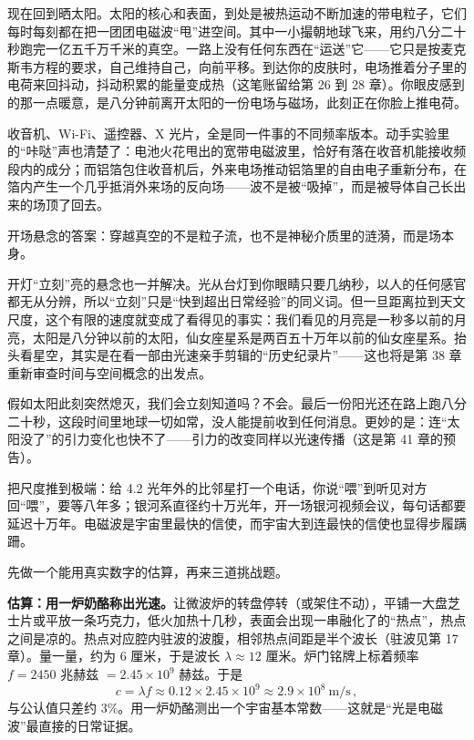 
\begin{mainline}
现在回到晒太阳。太阳的核心和表面，到处是被热运动不断加速的带电粒子，它们每时每刻都在把一团团电磁波“甩”进空间。其中一小撮朝地球飞来，用约八分二十秒跑完一亿五千万千米的真空。一路上没有任何东西在“运送”它——它只是按麦克斯韦方程的要求，自己维持自己，向前平移。到达你的皮肤时，电场推着分子里的电荷来回抖动，抖动积累的能量变成热（这笔账留给第 26 到 28 章）。你眼皮感到的那一点暖意，是八分钟前离开太阳的一份电场与磁场，此刻正在你脸上推电荷。

收音机、Wi-Fi、遥控器、X 光片，全是同一件事的不同频率版本。动手实验里的“咔哒”声也清楚了：电池火花甩出的宽带电磁波里，恰好有落在收音机能接收频段内的成分；而铝箔包住收音机后，外来电场推动铝箔里的自由电子重新分布，在箔内产生一个几乎抵消外来场的反向场——波不是被“吸掉”，而是被导体自己长出来的场顶了回去。

开场悬念的答案：穿越真空的不是粒子流，也不是神秘介质里的涟漪，而是场本身。

开灯“立刻”亮的悬念也一并解决。光从台灯到你眼睛只要几纳秒，以人的任何感官都无从分辨，所以“立刻”只是“快到超出日常经验”的同义词。但一旦距离拉到天文尺度，这个有限的速度就变成了看得见的事实：我们看见的月亮是一秒多以前的月亮，太阳是八分钟以前的太阳，仙女座星系是两百五十万年以前的仙女座星系。抬头看星空，其实是在看一部由光速亲手剪辑的“历史纪录片”——这也将是第 38 章重新审查时间与空间概念的出发点。
\end{mainline}


\begin{thought}[给太阳盖上盖子]
假如太阳此刻突然熄灭，我们会立刻知道吗？不会。最后一份阳光还在路上跑八分二十秒，这段时间里地球一切如常，没人能提前收到任何消息。更妙的是：连“太阳没了”的引力变化也快不了——引力的改变同样以光速传播（这是第 41 章的预告）。

把尺度推到极端：给 4.2 光年外的比邻星打一个电话，你说“喂”到听见对方回“喂”，要等八年多；银河系直径约十万光年，开一场银河视频会议，每句话都要延迟十万年。电磁波是宇宙里最快的信使，而宇宙大到连最快的信使也显得步履蹒跚。
\end{thought}

先做一个能用真实数字的估算，再来三道挑战题。

\textbf{估算：用一炉奶酪称出光速。}让微波炉的转盘停转（或架住不动），平铺一大盘芝士片或平放一条巧克力，低火加热十几秒，表面会出现一串融化了的“热点”，热点之间是凉的。热点对应腔内驻波的波腹，相邻热点间距是半个波长（驻波见第 17 章）。量一量，约为 6 厘米，于是波长 $\lambda\approx 12$ 厘米。炉门铭牌上标着频率 $f=2450$ 兆赫兹 $=2.45\times10^{9}$ 赫兹。于是
\[
  c=\lambda f\approx 0.12\times 2.45\times10^{9}\approx 2.9\times10^{8}\ \text{m/s}\,,
\]
与公认值只差约 $3\%$。用一炉奶酪测出一个宇宙基本常数——这就是“光是电磁波”最直接的日常证据。


